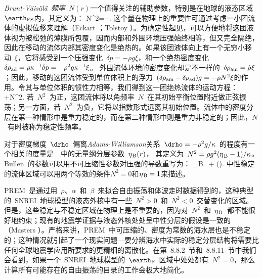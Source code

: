 {\em Brunt-V\"{a}is\"{a}l\"{a}~频率\/}~$N(r)$一个值得关注的辅助参数，特别是在地球的液态区域~$\earth_{\rm FS}$内，其定义为：
\eq \label{8.Brunt}
N^2=--.
\en
这个量在物理上的重要性可通过考虑一小团流体的虚拟位移来理解（Eckart \citeyear{eckart60}；Tolstoy \citeyear{tolstoy73}）。为确定性起见，可以方便地将这团液体视为被松弛的薄膜所包覆，因而内部和外围环境压强始终相等，但又完全隔绝，因此在移动的流体内部其密度变化是绝热的。如果该团液体向上有一个无穷小移动~$\xi$，它将感受到一个压强变化~$\delta p=-\rho g\xi$，和一个绝热密度变化~$\delta\hspace{-0.2 mm}\rho_{\rm ad}
=\rho\kappa^{-1}\delta p=-\rho^2g\kappa^{-1}\xi$。
外围流体环境的密度变化却是不一样的~$\delta\hspace{-0.2 mm}\rho_{\rm am}=\dot{\rho}\hspace{0.2 mm}\xi$；因此，移动的这团流体受到单位体积上的浮力~$(\delta\hspace{-0.2 mm}\rho_{\rm am}
-\delta\hspace{-0.2 mm}\rho_{\rm ad})g=-\rho N^2\xi$的作用。令其与单位体积的惯性力相等，我们得到这一团绝热流体的运动方程：
\eq
{}+N^2.
\en
若~$N^2$~为正，这团流体将以角频率~$N$~在其初始平衡位置附近做正弦振荡；另一方面，若~$N^2$~为负，它将以指数形式远离其初始位置。流体中的密度分层在第一种情形中是重力稳定的，而在第二种情形中则是重力非稳定的；因此，$N$~有时被称为稳定性频率。
%
%

对于密度梯度~$\drho$~偏离{\em Adams-Williamson\/}关系~$\drho=-\rho^2g/\kappa$~的程度有一个相关的度量是~\textcite{bullen63}~中的无量纲分层参数~$\eta_{\hspace{0.3 mm}\rm B}(r)$，
%
其定义为~$N^2=\rho g^2(\eta_{\hspace{0.3 mm}\rm B}-1)/\kappa$。
%
Bullen~的参数可以用不可压缩性参数对压强的导数重写为：
\eq
\eta_{\hspace{0.3 mm}\rm B}=+
\!\left(\frac{\kappa}{\rho}\right).
\en
中性稳定的流体区域可以用两个等效的条件$N^2=0$和$\eta_{\hspace{0.3 mm}\rm B}=1$来描述。
%
%

PREM~是通过用~$\rho$、$\alpha$~和~$\beta$~来拟合自由振荡和体波走时数据得到的，这种典型的~SNREI~地球模型的液态外核中有一些~$N^2>0$~和~$N^2<0$~交替变化的区域。但是，这些稳定与不稳定区域在物理上是不重要的，因为对~$N^2$~和~$\eta_{\hspace{0.3 mm}\rm B}$~都不能很好地约束；现有的地震学证据与液态外核处处呈中性分层的假设是一致的（Masters \citeyear{masters79}）。严格来讲，PREM~中可压缩的、密度为常数的海水层也是不稳定的；这种情况就引起了一个现实问题---要分辨海水中实际的稳定分层结构将需要比任何全球地震学应用所要求的更精细的离散化。在第~8.8.2~节和~8.8.11~节中我们会看到，如果一个~SNREI~地球模型的~$\earth_{\rm F}$~区域中处处都有~$N^2=0$，那么计算所有可能存在的自由振荡的目录的工作会极大地简化。
%
%

